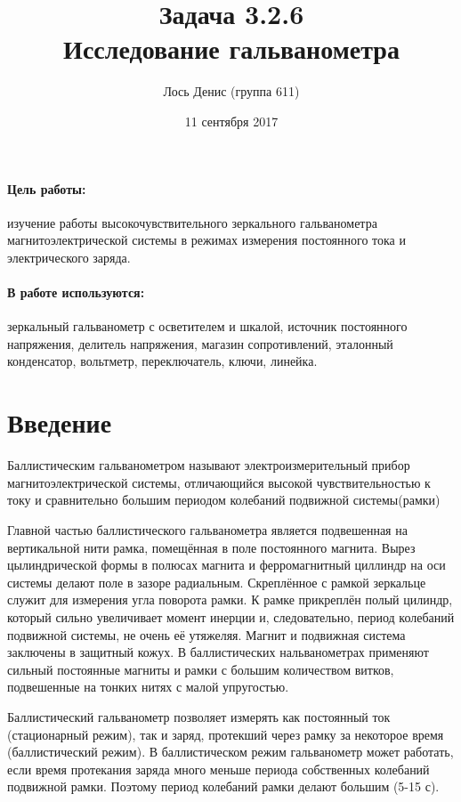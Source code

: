 \documentclass[12pt]{article}
\title{{\bf Задача 3.2.6\\ Исследование гальванометра}}
\author{Лось Денис (группа 611)}
\date{11 сентября 2017}
\begin{document}
\maketitle

\paragraph{Цель работы: } изучение работы высокочувствительного зеркального гальванометра магнитоэлектрической системы в режимах измерения постоянного тока и электрического заряда.

\paragraph{В работе используются: } зеркальный гальванометр с осветителем и шкалой, источник постоянного напряжения, делитель напряжения, магазин сопротивлений, эталонный конденсатор, вольтметр, переключатель, ключи, линейка.

\section*{Введение}
Баллистическим гальванометром называют электроизмерительный прибор магнитоэлектрической системы, отличающийся высокой чувствительностью к току  и сравнительно большим периодом колебаний подвижной системы(рамки)
\par
 	Главной частью баллистического гальванометра является подвешенная на вертикальной нити рамка, помещённая в поле постоянного магнита. Вырез цылиндрической формы в полюсах магнита и ферромагнитный циллиндр на оси системы делают поле в зазоре радиальным. Скреплённое с рамкой зеркальце служит для измерения угла поворота рамки. К рамке прикреплён полый цилиндр, который сильно увеличивает момент инерции и, следовательно, период колебаний подвижной системы, не очень её утяжеляя. Магнит и подвижная система заключены в защитный кожух. В баллистических нальванометрах применяют сильный постоянные магниты и рамки с большим количеством витков, подвешенные на тонких нитях с малой упругостью.
\par
	Баллистический гальванометр позволяет измерять как постоянный ток (стационарный режим), так и заряд, протекший через рамку за некоторое время (баллистический режим). В баллистическом режим гальванометр может работать, если время протекания заряда много меньше периода собственных колебаний подвижной рамки. Поэтому период колебаний рамки делают большим (5-15 с). 
\end{document}
